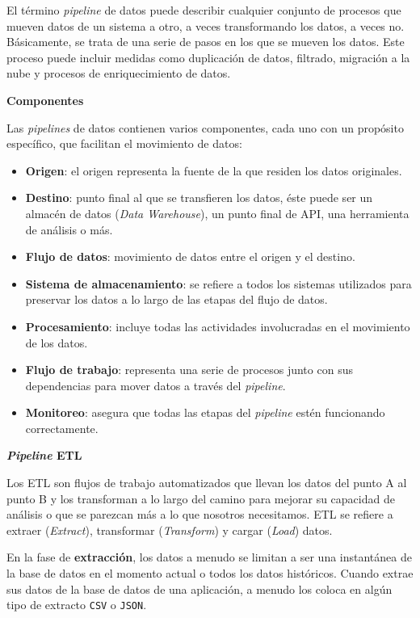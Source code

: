 \documentclass[a4paper,12pt]{article}
\begin{document}
		El término \textit{pipeline} de datos puede describir cualquier conjunto de procesos que mueven datos de un sistema a otro, a veces transformando los datos, a veces no. Básicamente, se trata de una serie de pasos en los que se mueven los datos. Este proceso puede incluir medidas como duplicación de datos, filtrado, migración a la nube y procesos de enriquecimiento de datos. \citep{Tobin2020Jun}
				
		\textbf{Componentes}
				
		Las \textit{pipelines} de datos contienen varios componentes, cada uno con un propósito específico, que facilitan el movimiento de datos:
		\begin{itemize}[noitemsep, topsep=2pt]
			\item \textbf{Origen}: el origen representa la fuente de la que residen los datos originales.
			\item \textbf{Destino}: punto final al que se transfieren los datos, éste puede ser un almacén de datos (\textit{Data Warehouse}), un punto final de API, una herramienta de análisis o más.
			\item \textbf{Flujo de datos}: movimiento de datos entre el origen y el destino.
			\item \textbf{Sistema de almacenamiento}: se refiere a todos los sistemas utilizados para preservar los datos a lo largo de las etapas del flujo de datos.
			\item \textbf{Procesamiento}: incluye todas las actividades involucradas en el movimiento de los datos.
			\item \textbf{Flujo de trabajo}: representa una serie de procesos junto con sus dependencias para mover datos a través del \textit{pipeline}.
			\item \textbf{Monitoreo}: asegura que todas las etapas del \textit{pipeline} estén funcionando correctamente.
		\end{itemize}
				
		\textbf{\textit{Pipeline} ETL}
				
		Los ETL son flujos de trabajo automatizados que llevan los datos del punto A al punto B y los transforman a lo largo del camino para mejorar su capacidad de análisis o que se parezcan más a lo que nosotros necesitamos. ETL se refiere a extraer (\textit{Extract}), transformar (\textit{Transform}) y cargar (\textit{Load}) datos. \citep{SeattleDataGuy}
				
		En la fase de \textbf{extracción}, los datos a menudo se limitan a ser una instantánea de la base de datos en el momento actual o todos los datos históricos. Cuando extrae sus datos de la base de datos de una aplicación, a menudo los coloca en algún tipo de extracto \texttt{CSV} o \texttt{JSON}. 
		
\end{document}
